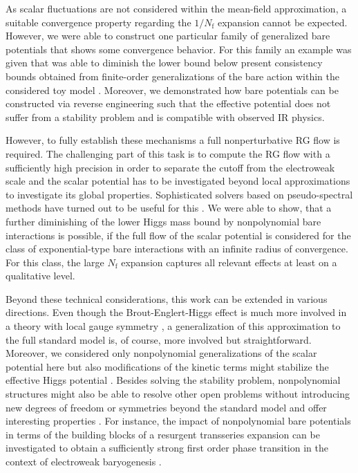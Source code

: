 \documentclass[twocolumn,aps,prd,showpacs,nofootinbib,superscriptaddress,preprintnumbers,floatfix,10pt]{revtex4-1}
\newcommand{\Nf}{N_{\mathrm{f}}}
\begin{document}
As scalar fluctuations are not considered within the mean-field approximation, a suitable convergence property regarding the $1/\Nf$ expansion cannot be expected. However, we were able to construct one particular family of generalized bare potentials that shows some convergence behavior. For this family an example was given that was able to diminish the lower bound below present consistency bounds obtained from finite-order generalizations of the bare action within the considered toy model \cite{Gies:2013fua,Jakovac:2015kka,Gies:2017zwf}. 
Moreover, we demonstrated how bare potentials can be constructed via reverse engineering such that the effective potential does not suffer from a stability problem and is compatible with observed IR physics. 


However, to fully establish these mechanisms a full nonperturbative RG flow is required.
The challenging part of this task is to compute the RG flow with a sufficiently high precision in order to separate the cutoff from the electroweak scale and the scalar potential has to be investigated beyond local approximations to investigate its global properties. Sophisticated solvers based on pseudo-spectral methods have turned out to be useful for this \cite{Borchardt:2015rxa,Borchardt:2016pif,Borchardt:2016kco,Knorr:2016sfs,Knorr:2017yze}. 
We were able to show, that a further diminishing of the lower Higgs mass bound by nonpolynomial bare interactions is possible, if the full flow of the scalar potential is considered for the class of exponential-type bare interactions with an infinite radius of convergence. For this class, the large $\Nf$ expansion captures all relevant effects at least on a qualitative level. 




Beyond these technical considerations, this work can be extended in various directions. Even though the Brout-Englert-Higgs effect is much more involved in a theory with local gauge symmetry \cite{tHooft:1979hnm,Osterwalder:1977pc,Banks:1979fi,Frohlich:1980gj,Frohlich:1981yi,Maas:2012tj,Maas:2013aia,Maas:2016ngo,Egger:2017tkd,Maas:2017xzh,Maas:2017pcw}, a generalization of this approximation to the full standard model is, of course, more involved but straightforward. Moreover, we considered only nonpolynomial generalizations of the scalar potential here but also modifications of the kinetic terms might stabilize the effective Higgs potential \cite{Ghoshal:2017egr}. 
Besides solving the stability problem, nonpolynomial structures might also be able to resolve other open problems without introducing new degrees of freedom or symmetries beyond the standard model and offer interesting properties \cite{Matone:2015dya}. 
For instance, the impact of nonpolynomial bare potentials in terms of the building blocks of a resurgent transseries expansion can be investigated to obtain a sufficiently strong first order phase transition in the context of electroweak baryogenesis \cite{Reichert:2017puo}. 
\end{document}
